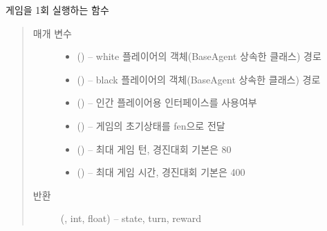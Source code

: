 \documentclass[letterpaper,10pt,english]{sphinxmanual}
\begin{document}
\begin{fulllineitems}
\label{\detokenize{scripts:scripts.run_game.game}}
게임을 1회 실행하는 함수
\begin{quote}\begin{description}
\item[{매개 변수}] \leavevmode\begin{itemize}
\item {} 
 () -- white 플레이어의 객체(BaseAgent 상속한 클래스) 경로

\item {} 
 () -- black 플레이어의 객체(BaseAgent 상속한 클래스) 경로

\item {} 
 () -- 인간 플레이어용 인터페이스를 사용여부

\item {} 
 () -- 게임의 초기상태를 fen으로 전달

\item {} 
 () -- 최대 게임 턴, 경진대회 기본은 80

\item {} 
 () -- 최대 게임 시간, 경진대회 기본은 400

\end{itemize}

\item[{반환}] \leavevmode
({\hyperref[\detokenize{scripts:scripts.run_game.State}]{}}, int, float) -- state, turn, reward

\end{description}\end{quote}

\end{fulllineitems}
\end{document}
